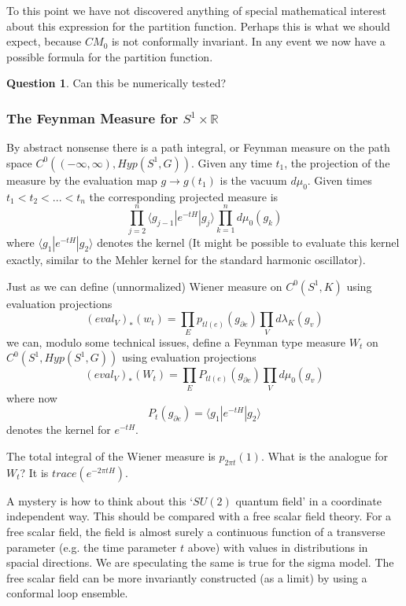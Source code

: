 \documentclass{amsart}
\theoremstyle{conjecture}
\theoremstyle{definition}
\theoremstyle{question}
\newtheorem{question}{Question}
\theoremstyle{questions}
\theoremstyle{remark}
\theoremstyle{remarks}
\theoremstyle{example}
\numberwithin{equation}{section}
\begin{document}
To this point we have not discovered anything of special mathematical interest about this expression
for the partition function. Perhaps this is what we should expect, because $CM_0$ is not conformally invariant. In any event we now
have a possible formula for the partition function. 

\begin{question} Can this be numerically tested?
\end{question}

\subsubsection{The Feynman Measure for $S^1\times \mathbb R$}\label{Feynmanmeasure}

By abstract nonsense there is a path integral, or Feynman measure on the path space
$C^0((-\infty,\infty),Hyp(S^1,G))$. Given any time $t_1$, the projection of the measure by the evaluation map $g\to g(t_1)$ is the vacuum $d\mu_0$. Given times $t_1<t_2<...<t_n$ the corresponding projected measure is
$$\prod_{j=2}^n\langle g_{j-1}|e^{-tH}|g_j\rangle\prod_{k=1}^n d\mu_0(g_k) $$
where $\langle g_{1}|e^{-tH}|g_2\rangle$ denotes the kernel (It might be possible to evaluate this kernel exactly, similar to the Mehler kernel for the standard harmonic oscillator).

Just as we can define (unnormalized) Wiener measure on $C^0(S^1,K)$ using evaluation projections
$$(eval_V)_*(w_t)=\prod_E p_{tl(e)}(g_{\partial e})\prod_V d\lambda_K(g_v) $$
we can, modulo some technical issues, define a Feynman type measure $W_t$ on $C^0(S^1,Hyp(S^1,G))$ using evaluation projections
$$(eval_V)_*(W_t)=\prod_E P_{tl(e)}(g_{\partial e})\prod_V d\mu_0(g_v) $$
where now
$$P_{t}(g_{\partial e})=\langle g_{1}|e^{-tH}|g_2\rangle$$ denotes the kernel for $e^{-tH}$.

The total integral of the Wiener measure is $p_{2\pi t}(1)$. What is the analogue for $W_t$? It is $trace(e^{-2\pi t H})$.

A mystery is how to think about this `$SU(2)$ quantum field' in a coordinate independent way. This should be compared with a 
free scalar field theory. For a free scalar field, the field is almost surely a continuous function of a transverse parameter (e.g. the time parameter $t$ above)
with values in distributions in spacial directions. We are speculating the same is true for the sigma model. The free scalar field can be more invariantly
constructed (as a limit) by using a conformal loop ensemble.
 
\end{document}

